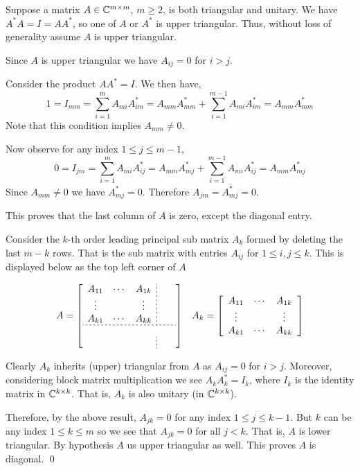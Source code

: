 \documentclass[10pt]{article}
\begin{document}
\begin{solution}[Solution]
Suppose a matrix \( A\in\mathbb{C}^{m\times m} \), \( m\geq2 \), is both triangular and unitary. We have \( A^*A=I=AA^* \), so one of \( A \) or \( A^* \) is upper triangular. Thus, without loss of generality assume \( A \) is upper triangular. 

Since \( A \) is upper triangular we have \( A_{ij}=0 \) for \( i>j \).

Consider the product \( AA^*=I \). We then have,
\[ 1= I_{mm} = \sum_{i=1}^{m}A_{mi}A^*_{im} = A_{mm}A^*_{mm} + \sum_{i=1}^{m-1}A_{mi}A^*_{im} = A_{mm}A^*_{mm} \]
Note that this condition implies \( A_{mm} \neq 0 \).

Now observe for any index \( 1\leq j\leq m-1 \),
\[ 0 = I_{jm} = \sum_{i=1}^{m}A_{mi}A^*_{ij} = A_{mm}A^*_{mj} + \sum_{i=1}^{m-1}A_{mi}A^*_{ij} =  A_{mm}A^*_{mj}  \]
Since \( A_{mm}\neq 0 \) we have \( A^*_{mj}=0 \). Therefore \( A_{jm}=\overline{A^*_{mj}}=0 \).

This proves that the last column of \( A \) is zero, except the diagonal entry.

Consider the \( k \)-th order leading principal sub matrix \( A_k \) formed by deleting the last \( m-k \) rows. That is the sub matrix with entries \( A_{ij} \) for \( 1\leq i,j\leq k \). This is displayed below as the top left corner of \( A \)

\begin{align*} 
    A  = 
    \left[\begin{array}{ccc;{2pt/2pt}cc} 
        A_{11} &\cdots & A_{1k} & \\
        \vdots &  & \vdots & & \\ 
        A_{k1} & \cdots & A_{kk} & & \\ 
        \hdashline[2pt/2pt] \\
        & & & & \\
    \end{array}\right] 
        && 
        A_k = 
        \left[\begin{array}{ccc} 
        A_{11} &\cdots & A_{1k} \\ 
        \vdots &  & \vdots  \\ 
        A_{k1} & \cdots & A_{kk}  
        \end{array}\right]
\end{align*}

Clearly \( A_k \) inherits (upper) triangular from \( A \) as \( A_{ij}=0 \) for \( i>j \). Moreover, considering block matrix multiplication we see \( A_kA_k^*= I_k \), where \( I_k \) is the identity matrix in \( \mathbb{C}^{k\times k} \). That is, \( A_k \) is also unitary (in \( \mathbb{C}^{k\times k} \)).

Therefore, by the above result, \( A_{jk}=0 \) for any index \( 1\leq j \leq k-1 \). But \( k \) can be any index \( 1\leq k\leq m \) so we see that \( A_{jk}=0 \) for all \( j<k \). That is, \( A \) is lower triangular. By hypothesis \( A \) us upper triangular as well. This proves \( A \) is diagonal. \qed

\end{solution}
	
\end{document}
